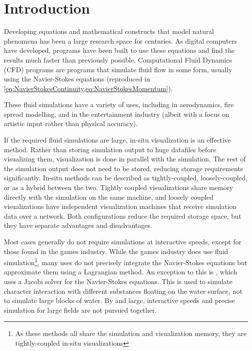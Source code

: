 
\chapter{Introduction}
\label{sec:Introduction} 
Developing equations and mathematical constructs that model natural phenomena has been a large research space for centuries.
As digital computers have developed, programs have been built to use these equations and find the results much faster than previously possible\cite{AtomicHeritageFoundationComputingProject}.
Computational Fluid Dynamics (CFD) programs are programs that simulate fluid flow in some form, usually using the Navier-Stokes equations (reproduced in \cref{eq:NavierStokesContinuity,eq:NavierStokesMomentum}).

These fluid simulations have a variety of uses,
including in aerodynamics\cite{jameson2002},%
fire spread modelling\cite{Sullivan_2009},
and in the entertainment industry (albeit with a focus on artistic input rather than physical accuracy\cite{article:FluidDynamicsOnBigScreen}).

If the required fluid simulations are large, in-situ visualization is an effective method.
Rather than storing simulation output to huge datafiles before visualizing them, visualization is done in parallel with the simulation\cite{kress2017situ}.
The rest of the simulation output does not need to be stored, reducing storage requirements significantly.
In-situ methods can be described as tightly-coupled, loosely-coupled, or as a hybrid between the two.
Tightly coupled visualizations share memory directly with the simulation on the same machine, and loosely coupled visualizations have independent visualization machines that receive simulation data over a network.
Both configurations reduce the required storage space, but they have separate advantages and disadvantages.

Most cases generally do not require simulations at interactive speeds, except for those found in the games industry.
While the games industry does use fluid simulation\cite{paper:GameFluidSummary:medveckyreal}\footnote{As these methods all share the simulation and visualization memory, they are tightly-coupled in-situ visualizations}, many uses do not precisely integrate the Navier-Stokes equations but approximate them using a Lagrangian method\cite{paper:StableFluids:10.1145/311535.311548}.
An exception to this is \cite{presentation:RealtimeFluidSimTombRaider}, which uses a Jacobi solver for the Navier-Stokes equations. This is used to simulate character interaction with different substances floating on the water surface\cite{presentation:RealtimeFluidSimTombRaider}, not to simulate large blocks of water.
By and large, interactive speeds and precise simulation for large fields are not pursued together.

